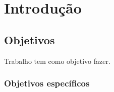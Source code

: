 \chapter{Introdução}
\label{intro}








\section{Objetivos}
\label{sec:Obj}

Trabalho tem como objetivo fazer.

\subsection{Objetivos específicos}

